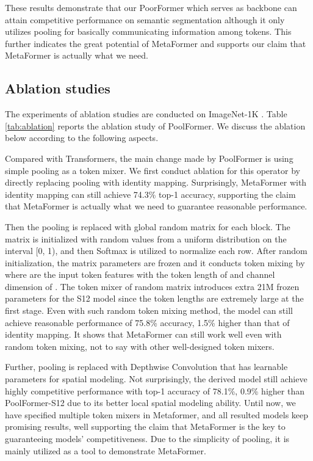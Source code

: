 These results demonstrate that our PoorFormer which serves as backbone can attain competitive performance on semantic segmentation although it only utilizes pooling for basically communicating information among tokens. This further indicates the great potential of MetaFormer and supports our claim that MetaFormer is actually what we need.


\subsection{Ablation studies}
\label{sec:ablation}
The experiments of ablation studies are conducted on ImageNet-1K \cite{imagenet}.
Table \ref{tab:ablation} reports the ablation study of PoolFormer. 
We discuss the ablation below according to the following aspects. 


 Compared with Transformers, the main change made by PoolFormer is using simple pooling as a token mixer. We first conduct ablation for this operator by directly replacing pooling with identity mapping. Surprisingly, MetaFormer with identity mapping can still achieve 74.3\% top-1 accuracy, supporting the claim that MetaFormer is actually what we need to guarantee reasonable performance.


Then the pooling is replaced with global random matrix  for each block. The matrix is initialized with random values from a uniform distribution on the interval [0, 1), and then Softmax is utilized to normalize each row. After random initialization, the matrix parameters are frozen and it conducts token mixing by  where  are the input token features with the token length of  and channel dimension of . The token mixer of random matrix introduces extra 21M frozen parameters for the S12 model since the token lengths are extremely large at the first stage. Even with such random token mixing method, the model can still achieve reasonable performance of 75.8\% accuracy, 1.5\% higher than that of identity mapping. It shows that MetaFormer can still work well even with random token mixing, not to say with other well-designed token mixers. 


Further, pooling is replaced with Depthwise Convolution \cite{chollet2017xception, mamalet2012simplifying} that has learnable parameters for spatial modeling. Not surprisingly, the derived model still achieve highly competitive performance with top-1 accuracy of 78.1\%, 0.9\% higher than PoolFormer-S12 due to its better local spatial modeling ability. Until now, we have specified multiple token mixers in Metaformer, and all resulted models keep promising results, well supporting the claim that MetaFormer is the key to guaranteeing models' competitiveness. Due to the simplicity of pooling, it is mainly utilized as a tool to demonstrate MetaFormer.


